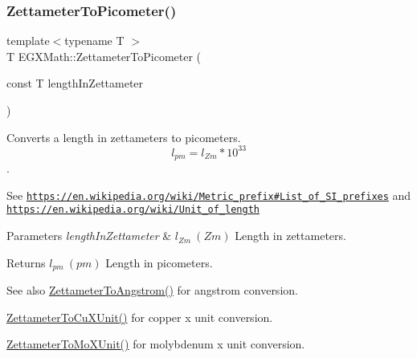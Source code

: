 \subsubsection{\texorpdfstring{Zettameter\+To\+Picometer()}{ZettameterToPicometer()}}
{\footnotesize\ttfamily template$<$typename T $>$ \\
T E\+G\+X\+Math\+::\+Zettameter\+To\+Picometer (\begin{DoxyParamCaption}\item[{const T}]{length\+In\+Zettameter }\end{DoxyParamCaption})}



Converts a length in zettameters to picometers. \[ l_{pm}=l_{Zm} * 10^{33} \]. 

See \href{https://en.wikipedia.org/wiki/Metric_prefix#List_of_SI_prefixes}{\tt https\+://en.\+wikipedia.\+org/wiki/\+Metric\+\_\+prefix\#\+List\+\_\+of\+\_\+\+S\+I\+\_\+prefixes} and \href{https://en.wikipedia.org/wiki/Unit_of_length}{\tt https\+://en.\+wikipedia.\+org/wiki/\+Unit\+\_\+of\+\_\+length} 
\begin{DoxyParams}{Parameters}
{\em length\+In\+Zettameter} & $ l_{Zm}\ (Zm)$ Length in zettameters. \\
\hline
\end{DoxyParams}
\begin{DoxyReturn}{Returns}
$ l_{pm}\ (pm)$ Length in picometers. 
\end{DoxyReturn}
\begin{DoxySeeAlso}{See also}
\mbox{\hyperlink{group___e_g_x_math-_conversions-_length_conversions-_s_i-_zettameter-_non-_s_i_ga49d813ff9592fc1fc9a184436d0849fc}{Zettameter\+To\+Angstrom()}} for angstrom conversion. 

\mbox{\hyperlink{group___e_g_x_math-_conversions-_length_conversions-_s_i-_zettameter-_non-_s_i_ga91f2890d91086a45ad9d2b5e7e82b60a}{Zettameter\+To\+Cu\+X\+Unit()}} for copper x unit conversion. 

\mbox{\hyperlink{group___e_g_x_math-_conversions-_length_conversions-_s_i-_zettameter-_non-_s_i_ga10039261b7de3417e69110a56312b9ef}{Zettameter\+To\+Mo\+X\+Unit()}} for molybdenum x unit conversion. 
\end{DoxySeeAlso}
\mbox{\label{group___e_g_x_math-_conversions-_length_conversions-_s_i-_zettameter-_s_i_ga16dfe32824b09a16e5af4a6f663c0f38}} 
